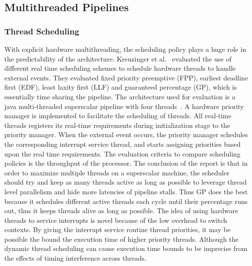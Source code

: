 \subsection{Multithreaded Pipelines}
\subsubsection{Thread Scheduling}
With explicit hardware multithreading, the scheduling policy plays a huge role in the predictability of the architecture.
Kreuzinger et al.~\cite{Kreuzinger2000RTmultithread} evaluated the use of different real time scheduling schemes to schedule hardware threads to handle external events. 
They evaluated fixed priority preemptive (FPP), earliest deadline first (EDF), least laxity first (LLF) and guaranteed percentage (GP), which is essentially time sharing the pipeline. 
The architecture used for evaluation is a java multi-threaded superscalar pipeline with four threads~\cite{Kreuzinger2003multithreadeventhandle}. 
A hardware priority manager is implemented to facilitate the scheduling of threads. 
All real-time threads registers its real-time requirements during initialization stage to the priority manager. 
When the external event occurs, the priority manager schedules the corresponding interrupt service thread, and starts assigning priorities based upon the real time requirements. 
The evaluation criteria to compare scheduling policies is the throughput of the processor. 
The conclusion of the report is that in order to maximize multiple threads on a superscalar machine, the scheduler should try and keep as many threads active as long as possible to leverage thread level parallelism and hide more latencies of pipeline stalls. 
Thus GP does the best because it schedules different active threads each cycle until their percentage runs out, thus it keeps threads alive as long as possible. 
The idea of using hardware threads to service interrupts is novel because of the low overhead to switch contexts. 
By giving the interrupt service routine thread priorities, it may be possible the bound the execution time of higher priority threads. 
Although the dynamic thread scheduling can cause execution time bounds to be imprecise from the effects of timing interference across threads.  
  
